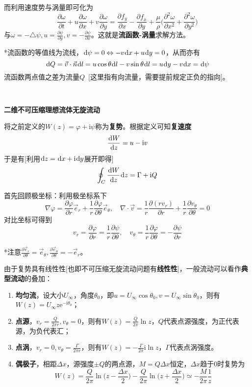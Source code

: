 \documentclass[a4paper,UTF8,fontset=windows]{ctexart}
\newcommand*{\dr}{\hspace{0.07em}\mathrm{d}}
\begin{document}
而利用速度势与涡量即可化为
$$\frac{\partial\omega}{\partial t}+u\frac{\partial\omega}{\partial x}+v\frac{\partial\omega}{\partial y}=\frac{\partial f_y}{\partial x}-\frac{\partial f_x}{\partial y}+\frac{\mu}{\rho}\bigg(\frac{\partial^2\omega}{\partial x^2}+\frac{\partial^2\omega}{\partial y^2}\bigg)$$
与$\omega=-\triangle\psi,u=\frac{\partial\psi}{\partial y},v=-\frac{\partial\psi}{\partial x}$。这就是\textbf{流函数-涡量}求解方法。

*流函数的等值线为流线，$\dr\psi=0\Leftrightarrow-v\dr x+u\dr y=0$，从而亦有
$$\dr Q=\vec{v}\cdot\vec{n}\dr l=u\cos\theta\dr l-v\sin\theta\dr l=u\dr y-v\dr x=\dr\psi$$
流函数两点值之差为流量$Q$\ [这里指有向流量，需要提前规定正负的指向]。

\

\textbf{二维不可压缩理想流体无旋流动}

将之前定义的$W(z)=\varphi+\mathrm{i}\psi$称为\textbf{复势}。根据定义可知\textbf{复速度}
$$\frac{\dr W}{\dr z}=u-\mathrm{i}v$$
于是有[利用$\dr z=\dr x+\mathrm{i}\dr y$展开即得]
$$\oint_C\frac{\dr W}{\dr z}\dr z=\Gamma+\mathrm{i}Q$$

首先回顾极坐标：利用极坐标系下
$$\nabla\varphi=\frac{\partial\varphi}{\partial r}\vec{e}_r+\frac{1}{r}\frac{\partial\varphi}{\partial\theta}\vec{e}_\theta,\quad\nabla\cdot\vec{v}=\frac{1}{r}\frac{\partial(rv_r)}{\partial r}+\frac{1}{r}\frac{\partial v_\theta}{\partial\theta}=0$$
对比坐标可得到
$$v_r=\frac{\partial\varphi}{\partial r}=\frac{1}{r}\frac{\partial\psi}{\partial\theta},\quad v_\theta=\frac{1}{r}\frac{\partial\varphi}{\partial\theta}=-\frac{\partial\psi}{\partial r}$$

*注意$\frac{\partial\vec{e}_r}{\partial\theta}=\vec{e}_\theta,\frac{\partial\vec{e}_\theta}{\partial\theta}=-\vec{e}_r$。

由于复势具有线性性[也即不可压缩无旋流动问题有\textbf{线性性}]，一般流动可以看作\textbf{典型流动}的叠加：
\begin{enumerate}
    \item \textbf{均匀流}，设大小$U_\infty$，角度$\theta_0$，即$u=U_\infty\cos\theta_0,v=U_\infty\sin\theta_0$，则有$W(z)=U_\infty z\mathrm{e}^{-\mathrm{i}\theta_0}$；
    \item \textbf{点源}，$v_r=\frac{Q}{2\pi r},v_\theta=0$，则有$W(z)=\frac{Q}{2\pi}\ln z$，$Q$代表点源强度，为正代表源，为负代表汇；
    \item \textbf{点涡}，$v_r=0,v_\theta=\frac{\Gamma}{2\pi r}$，则有$W(z)=-\frac{\Gamma}{2\pi}\mathrm{i}\ln z$，$\Gamma$代表点涡强度。
    \item \textbf{偶极子}，相距$\Delta x$，源强度$\pm Q$的两点源，$M=Q\Delta x$恒定，$\Delta x$趋于0时复势为
    $$W(z)=\frac{Q}{2\pi}\ln\bigg(z-\frac{\Delta x}{2}\bigg)-\frac{Q}{2\pi}\ln\bigg(z+\frac{\Delta x}{2}\bigg)\simeq-\frac{M}{2\pi}\frac{1}{z}$$
\end{enumerate}
\end{document}
